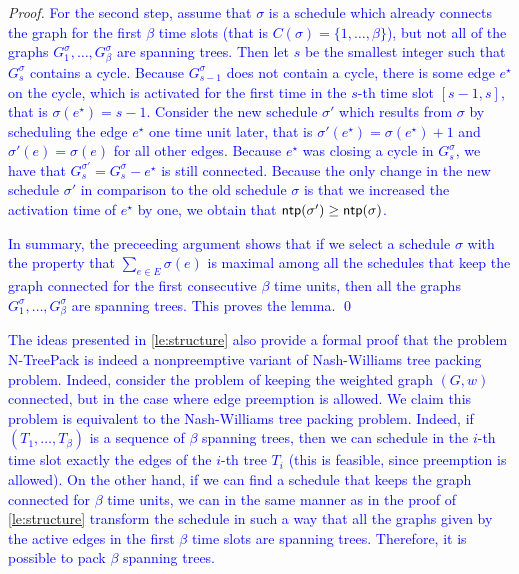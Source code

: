\documentclass[runningheads]{llncs}
\newcommand{\set}[1]{\{ #1 \}}
\newcommand{\fromto}[2]{\set{#1, \ldots, #2}}
\newcommand{\xxxNTP}{{\sc N-TreePack}}
\DeclareMathOperator{\ntp}{\text{\sf ntp}}
\newcommand{\lasse}[1]{\textcolor{blue}{#1}}
\begin{document}
\begin{proof}
\lasse{
For the second step, assume that $\sigma$ is a schedule which already connects the graph for the first $\beta$ time slots (that is $C(\sigma) = \fromto{1}{\beta}$), but not all of the graphs $G^\sigma_1,\dots,G^\sigma_\beta$ are spanning trees. 
Then let $s$ be the smallest integer such that $G^\sigma_s$ contains a cycle.
 Because $G^\sigma_{s-1}$ does not contain a cycle, there is some edge $e^\star$ on the cycle, which is activated for the first time in the $s$-th time slot $[s-1, s]$, that is $\sigma(e^\star) = s-1$. 
Consider the new schedule $\sigma'$ which results from $\sigma$ by scheduling the edge $e^\star$ one time unit later, that is $\sigma'(e^\star) = \sigma(e^\star) + 1$ and $\sigma'(e) = \sigma(e)$ for all other edges. 
Because $e^\star$ was closing a cycle in $G^\sigma_s$, we have that $G^{\sigma'}_s = G^\sigma_s - e^\star$ is still connected.
 Because the only change in the new schedule $\sigma'$ in comparison to the old schedule $\sigma$ is that we increased the activation time of $e^\star$ by one, we obtain that $\ntp(\sigma') \geq \ntp(\sigma)$.} 

\lasse{
In summary, the preceeding argument shows that if we select a schedule $\sigma$ with the property that $\sum_{e \in E}\sigma(e)$ is maximal among all the schedules that keep the graph connected for the first consecutive $\beta$ time units, then all the graphs $G^\sigma_1,\dots,G^\sigma_\beta$ are spanning trees. This proves the lemma. \qed
}
\end{proof}

\lasse{The ideas presented in \cref{le:structure} also provide a formal proof that the problem {\xxxNTP} is indeed a nonpreemptive variant of Nash-Williams tree packing problem. Indeed, consider the problem of keeping the weighted graph $(G, w)$ connected, but in the case where edge preemption is allowed. We claim this problem is equivalent to the Nash-Williams tree packing problem. Indeed, if $(T_1,\dots,T_\beta)$ is a sequence of $\beta$ spanning trees, then we can schedule in the $i$-th time slot exactly the edges of the $i$-th tree $T_i$ 
(this is feasible, since preemption is allowed). On the other hand, if we can find a schedule that keeps the graph connected for $\beta$ time units, we can in the same manner as in the proof of \cref{le:structure} transform the schedule in such a way that all the graphs given by the active edges in the first $\beta$ time slots are spanning trees. 
Therefore, it is possible to pack $\beta$ spanning trees.  }
\end{document}
